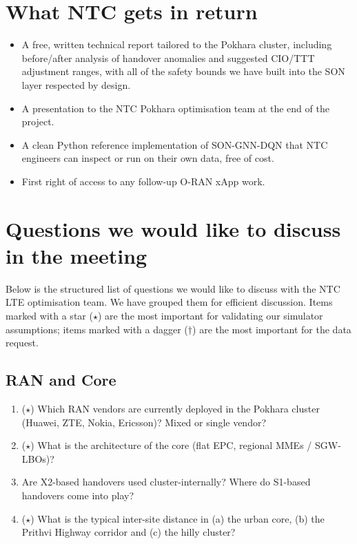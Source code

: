 \documentclass[11pt,a4paper]{article}
\begin{document}
\section{What NTC gets in return}

\begin{itemize}[leftmargin=*]
    \item A free, written technical report tailored to the Pokhara
    cluster, including before/after analysis of handover anomalies and
    suggested CIO/TTT adjustment ranges, with all of the safety bounds
    we have built into the SON layer respected by design.
    \item A presentation to the NTC Pokhara optimisation team at the
    end of the project.
    \item A clean Python reference implementation of SON-GNN-DQN that
    NTC engineers can inspect or run on their own data, free of cost.
    \item First right of access to any follow-up O-RAN xApp work.
\end{itemize}

\section{Questions we would like to discuss in the meeting}

Below is the structured list of questions we would like to discuss with
the NTC LTE optimisation team. We have grouped them for efficient
discussion. Items marked with a star ($\star$) are the most important
for validating our simulator assumptions; items marked with a dagger
($\dagger$) are the most important for the data request.

\subsection{RAN and Core}

\begin{enumerate}[leftmargin=*]
    \item ($\star$) Which RAN vendors are currently deployed in the
    Pokhara cluster (Huawei, ZTE, Nokia, Ericsson)? Mixed or single
    vendor?
    \item ($\star$) What is the architecture of the core (flat EPC,
    regional MMEs / SGW-LBOs)?
    \item Are X2-based handovers used cluster-internally? Where do
    S1-based handovers come into play?
    \item ($\star$) What is the typical inter-site distance in (a) the
    urban core, (b) the Prithvi Highway corridor and (c) the hilly
    cluster?
\end{enumerate}
\end{document}
